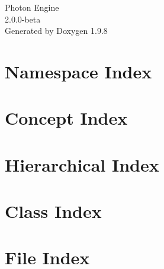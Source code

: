 \documentclass[twoside]{book}
\newcommand{\+}{\discretionary{\mbox{\scriptsize$\hookleftarrow$}}{}{}}
\newcommand{\clearemptydoublepage}{%
    \newpage{\pagestyle{empty}\cleardoublepage}%
  }
\begin{document}
  \raggedbottom
    \hypersetup{pageanchor=false,
                bookmarksnumbered=true,
                pdfencoding=unicode
               }
  \begin{titlepage}
  \vspace*{7cm}
  \begin{center}%
  {\Large Photon Engine}\\
  [1ex]\large 2.\+0.\+0-\/beta \\
  \vspace*{1cm}
  {\large Generated by Doxygen 1.9.8}\\
  \end{center}
  \end{titlepage}
  \clearemptydoublepage
  \tableofcontents
  \clearemptydoublepage
  \hypersetup{pageanchor=true}


\chapter{Namespace Index}

\chapter{Concept Index}

\chapter{Hierarchical Index}

\chapter{Class Index}

\chapter{File Index}

\end{document}

